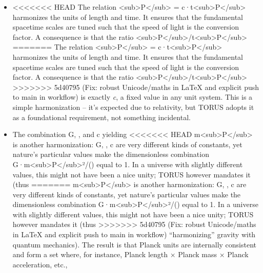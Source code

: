 \documentclass[]{article}
\begin{document}
{\begin{itemize}
\item
<<<<<<< HEAD
  The relation \ell\textless sub\textgreater P\textless/sub\textgreater{} =
  c·t\textless sub\textgreater P\textless/sub\textgreater{} harmonizes
  the units of length and time. It ensures that the fundamental
  spacetime scales are tuned such that the speed of light is the
  conversion factor. A consequence is that the ratio
  \ell\textless sub\textgreater P\textless/sub\textgreater/t\textless sub\textgreater P\textless/sub\textgreater{}
=======
  The relation
  \ell\textless{}sub\textgreater{}P\textless{}/sub\textgreater{} =
  c·t\textless{}sub\textgreater{}P\textless{}/sub\textgreater{}
  harmonizes the units of length and time. It ensures that the
  fundamental spacetime scales are tuned such that the speed of light is
  the conversion factor. A consequence is that the ratio
  \ell\textless{}sub\textgreater{}P\textless{}/sub\textgreater{}/t\textless{}sub\textgreater{}P\textless{}/sub\textgreater{}
>>>>>>> 5d40795 (Fix: robust Unicode/maths in LaTeX and explicit push to main in workflow)
  is exactly \emph{c}, a fixed value in any unit system. This is a
  simple harmonization -- it's expected due to relativity, but TORUS
  adopts it as a foundational requirement, not something incidental.
\item
  The combination G, \hbar, and c yielding
<<<<<<< HEAD
  m\textless sub\textgreater P\textless/sub\textgreater{} is another
  harmonization: G, \hbar, c are very different kinds of constants, yet
  nature's particular values make the dimensionless combination
  G·m\textless sub\textgreater P\textless/sub\textgreater²/(\hbarc) equal to
  1\hspace{0pt}. In a universe with slightly different values, this
  might not have been a nice unity; TORUS however mandates it (thus
=======
  m\textless{}sub\textgreater{}P\textless{}/sub\textgreater{} is another
  harmonization: G, \hbar, c are very different kinds of constants, yet
  nature's particular values make the dimensionless combination
  G·m\textless{}sub\textgreater{}P\textless{}/sub\textgreater{}²/(\hbarc)
  equal to 1​. In a universe with slightly different values, this might
  not have been a nice unity; TORUS however mandates it (thus
>>>>>>> 5d40795 (Fix: robust Unicode/maths in LaTeX and explicit push to main in workflow)
  ``harmonizing'' gravity with quantum mechanics). The result is that
  Planck units are internally consistent and form a set where, for
  instance, Planck length × Planck mass × Planck acceleration, etc.,

\end{itemize}}
\end{document}
